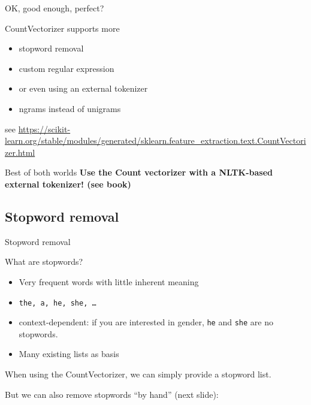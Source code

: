 \documentclass[compress]{beamer}
\begin{document}
\begin{frame}{OK, good enough, perfect?}
	\begin{block}{CountVectorizer supports more}
		\begin{itemize}
			\item stopword removal
			\item custom regular expression
			\item or even using an external tokenizer
			\item ngrams instead of unigrams
		\end{itemize}
	\end{block}
			\tiny{see \url{https://scikit-learn.org/stable/modules/generated/sklearn.feature\_extraction.text.CountVectorizer.html}}

\pause
\begin{alertblock}{Best of both worlds}
\textbf{Use the Count vectorizer with a NLTK-based external tokenizer! (see book)}
\end{alertblock}
\end{frame}



\subsection{Stopword removal}



\begin{frame}{Stopword removal}
	\begin{block}{What are stopwords?}
		\begin{itemize}
			\item Very frequent words with little inherent meaning
			\item \texttt{the, a, he, she, \ldots}
			\item context-dependent: if you are interested in gender, \texttt{he} and \texttt{she} are no stopwords. 
			\item Many existing lists as basis
		\end{itemize}
	\end{block}

When using the CountVectorizer, we can simply provide a stopword list. 

But we can also remove stopwords ``by hand'' (next slide):
\end{frame}
\end{document}
